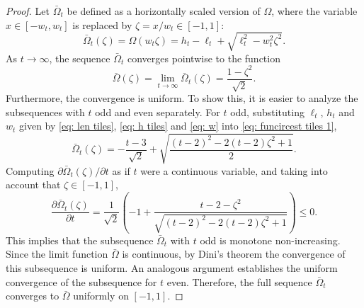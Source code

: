 \documentclass[12pt, a4paper]{article}
\newcommand{\len}{\ell} %
\newcommand{\tiles}{t} %
\newcommand{\funcirc}{\Omega}
\newcommand{\funcircesc}{\bar \Omega}
\begin{document}
\begin{proof}
Let $\funcircesc_\tiles$ be defined as a horizontally scaled version of $\funcirc$, where the variable $x \in [-w_\tiles, w_\tiles]$ is replaced by $\zeta = x/w_\tiles \in [-1,1]$:
\begin{equation}
\label{eq: funcircest tiles 1}
\funcircesc_\tiles(\zeta) = \funcirc\left(w_\tiles \zeta\right) = h_\tiles - \len_\tiles + \sqrt{\len_\tiles^2-w^2_\tiles\zeta^2}.
\end{equation}
As $\tiles \rightarrow \infty$, the sequence $\funcircesc_\tiles$ converges pointwise to the function
\begin{equation}
\label{eq: funcircesc}
\funcircesc(\zeta) = \lim_{\tiles \rightarrow \infty} \funcircesc_\tiles(\zeta) = \frac{1 -\zeta^2}{\sqrt{2}}.
\end{equation}
Furthermore, the convergence is uniform. To show this, it is easier to analyze the subsequences with $\tiles$ odd and even separately. For $\tiles$ odd, substituting $\len_\tiles$, $h_\tiles$  and $w_\tiles$ given by \eqref{eq: len tiles}, \eqref{eq: h tiles} and \eqref{eq: w} into \eqref{eq: funcircest tiles 1},
\begin{equation}
\label{eq: funcircesc, odd 1}
\funcircesc_\tiles(\zeta) =
-\frac{\tiles-3}{\sqrt{2}} + \sqrt{\frac{(\tiles-2)^2 - 2(\tiles-2)\zeta^2 +1 }{2}}.
\end{equation}
Computing $\partial \funcircesc_\tiles(\zeta)/\partial\tiles$ as if $\tiles$ were a continuous variable, and taking into account that $\zeta \in [-1,1]$,
\begin{equation}
\label{eq: der funcircesc, odd 1}
\frac{\partial \funcircesc_\tiles(\zeta)}{\partial \tiles} = \frac 1 {\sqrt{2}} \left(
-1 + \frac{\tiles-2-\zeta^2}{\sqrt{(\tiles-2)^2 - 2(\tiles-2)\zeta^2 + 1}} \right) \leq 0.
\end{equation}
This implies that the subsequence $\funcircesc_\tiles$ with $\tiles$ odd is monotone non-increasing. Since the limit function $\funcircesc$ is continuous, by Dini's theorem \cite[section~1.1]{Hirsch99} the convergence of this subsequence is uniform. An analogous argument establishes the uniform convergence of the subsequence for $\tiles$ even.
Therefore, the full sequence $\funcircesc_\tiles$ converges to $\funcircesc$ uniformly on $[-1,1]$.


\end{proof}
\end{document}
